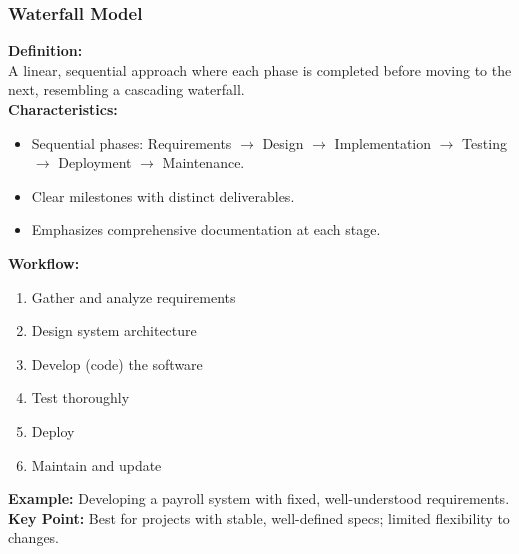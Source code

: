 \documentclass{beamer}
\begin{document}
\begin{frame}[fragile]
  \frametitle{Waterfall Model}
  \textbf{Definition:} \\
  A linear, sequential approach where each phase is completed before moving to the next, resembling a cascading waterfall.
  \\
  \textbf{Characteristics:}
  \begin{itemize}
    \item Sequential phases: Requirements $\rightarrow$ Design $\rightarrow$ Implementation $\rightarrow$ Testing $\rightarrow$ Deployment $\rightarrow$ Maintenance.
    \item Clear milestones with distinct deliverables.
    \item Emphasizes comprehensive documentation at each stage.
  \end{itemize}
  \textbf{Workflow:}
  \begin{enumerate}
    \item Gather and analyze requirements
    \item Design system architecture
    \item Develop (code) the software
    \item Test thoroughly
    \item Deploy
    \item Maintain and update
  \end{enumerate}
  \textbf{Example:} Developing a payroll system with fixed, well-understood requirements.
  \textbf{Key Point:} Best for projects with stable, well-defined specs; limited flexibility to changes.
\end{frame}
\end{document}
